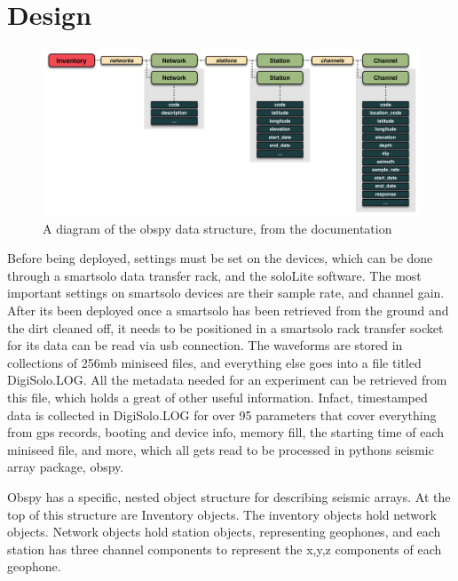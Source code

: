 
\section{Design}
\begin{figure}[ht]
    \centering
    \includegraphics[scale = 0.7]{reportImgs/Inventory.png}
    \caption{A diagram of the obspy data structure, from the documentation}
\end{figure}



Before being deployed, settings must be set on the devices, which can be done through a smartsolo data transfer rack, and the soloLite software. 
The most important settings on smartsolo devices are their sample rate, and channel gain. 
After its been deployed once a smartsolo has been retrieved from the ground and the dirt cleaned off, it needs to be  positioned in a smartsolo rack transfer socket for its data can be read via usb connection.
The waveforms are stored in collections of 256mb miniseed files, and everything else goes into a file titled DigiSolo.LOG. All the metadata needed for an experiment can be retrieved from this file, 
which holds a great of other useful information. Infact, timestamped data is collected in DigiSolo.LOG for over 95 parameters that cover everything from gps records, booting and device info, 
memory fill, the starting time of each miniseed file, and more, which all gets read to be processed in pythons seismic array package, obspy. 

Obspy has a specific, nested object  structure for describing seismic arrays. At the top of this structure are Inventory objects. 
The inventory objects hold network objects. Network objects hold station objects, representing geophones, and each station has three channel components
to represent the x,y,z components of each geophone.

